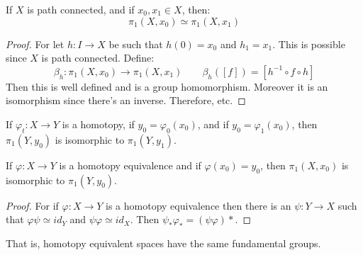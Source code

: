         \begin{theorem}
            If $X$ is path connected, and if $x_{0},x_{1}\in{X}$,
            then:
            \begin{equation}
                \pi_{1}(X,x_{0})\simeq\pi_{1}(X,x_{1})
            \end{equation}
        \end{theorem}
        \begin{proof}
            For let $h:I\rightarrow{X}$ be such that
            $h(0)=x_{0}$ and $h_{1}=x_{1}$. This is possible
            since $X$ is path connected. Define:
            \begin{equation}
                \beta_{h}:\pi_{1}(X,x_{0})\rightarrow
                \pi_{1}(X,x_{1})\quad\quad
                \beta_{h}([f])=[h^{\minus{1}}\circ{f}\circ{h}]
            \end{equation}
            Then this is well defined and is a group homomorphism.
            Moreover it is an isomorphism since there's an
            inverse. Therefore, etc.
        \end{proof}
        \begin{theorem}
            If $\varphi_{t}:X\rightarrow{Y}$ is a homotopy,
            if $y_{0}=\varphi_{0}(x_{0})$, and if
            $y_{0}=\varphi_{1}(x_{0})$, then
            $\pi_{1}(Y,y_{0})$ is isomorphic to
            $\pi_{1}(Y,y_{1})$.
        \end{theorem}
        \begin{theorem}
            If $\varphi:X\rightarrow{Y}$ is a homotopy
            equivalence and if $\varphi(x_{0})=y_{0}$, then
            $\pi_{1}(X,x_{0})$ is isomorphic to
            $\pi_{1}(Y,y_{0})$.
        \end{theorem}
        \begin{proof}
            For if $\varphi:X\rightarrow{Y}$ is a homotopy
            equivalence then there is an
            $\psi:Y\rightarrow{X}$ such that
            $\varphi\psi\simeq id_{Y}$ and
            $\psi\varphi\simeq id_{X}$. Then
            $\psi_{*}\varphi_{*}=(\psi\varphi){*}$.
        \end{proof}
        That is, homotopy equivalent spaces have the same
        fundamental groups.
